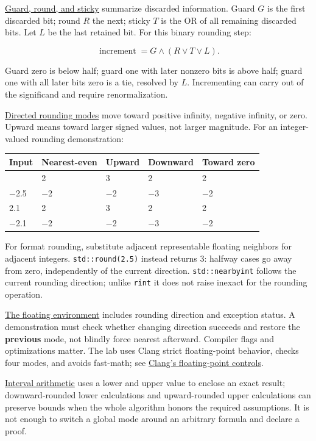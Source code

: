 \hyperref[appendix-b572b631069b]{Guard, round, and sticky} summarize discarded information. Guard \(G\) is the first discarded bit; round \(R\) the next; sticky \(T\) is the OR of all remaining discarded bits. Let \(L\) be the last retained bit. For this binary rounding step:

\[
\operatorname{increment}=G\land(R\lor T\lor L).
\]

Guard zero is below half; guard one with later nonzero bits is above half; guard one with all later bits zero is a tie, resolved by \(L\). Incrementing can carry out of the significand and require renormalization.

\hyperref[appendix-637d164ae5ca]{Directed rounding modes} move toward positive infinity, negative infinity, or zero. Upward means toward larger signed values, not larger magnitude. For an integer-valued rounding demonstration:

{\def\LTcaptype{none} %
\begin{longtable}[]{@{}lllll@{}}
\toprule\noalign{}
Input & Nearest-even & Upward & Downward & Toward zero \\
\midrule\noalign{}
\endhead
\bottomrule\noalign{}
\endlastfoot
2.5 & 2 & 3 & 2 & 2 \\
−2.5 & −2 & −2 & −3 & −2 \\
2.1 & 2 & 3 & 2 & 2 \\
−2.1 & −2 & −2 & −3 & −2 \\
\end{longtable}
}

For format rounding, substitute adjacent representable floating neighbors for adjacent integers. \texttt{std::round(2.5)} instead returns 3: halfway cases go away from zero, independently of the current direction. \texttt{std::nearbyint} follows the current rounding direction; unlike \texttt{rint} it does not raise inexact for the rounding operation.

\hyperref[appendix-f11d1a521253]{The floating environment} includes rounding direction and exception status. A demonstration must check whether changing direction succeeds and restore the \textbf{previous} mode, not blindly force nearest afterward. Compiler flags and optimizations matter. The lab uses Clang strict floating-point behavior, checks four modes, and avoids fast-math; see \href{https://clang.llvm.org/docs/UsersManual.html\#controlling-floating-point-behavior}{Clang's floating-point controls}.

\hyperref[appendix-1823a14330cb]{Interval arithmetic} uses a lower and upper value to enclose an exact result; downward-rounded lower calculations and upward-rounded upper calculations can preserve bounds when the whole algorithm honors the required assumptions. It is not enough to switch a global mode around an arbitrary formula and declare a proof.

